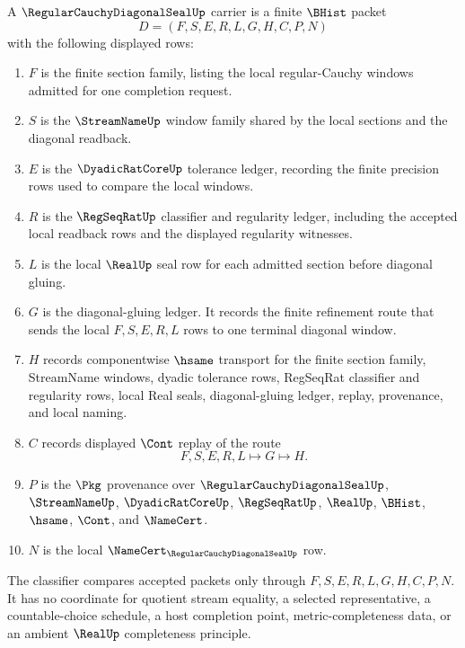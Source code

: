 \begin{definition}
\label{def:real-completeness-regular-cauchy-diagonal-seal-carrier}
A $\RegularCauchyDiagonalSealUp$ carrier is a finite $\BHist$ packet
$$
D=(F,S,E,R,L,G,H,C,P,N)
$$
with the following displayed rows:
\begin{enumerate}
\item $F$ is the finite section family, listing the local regular-Cauchy windows admitted for one completion request.
\item $S$ is the $\StreamNameUp$ window family shared by the local sections and the diagonal readback.
\item $E$ is the $\DyadicRatCoreUp$ tolerance ledger, recording the finite precision rows used to compare the local windows.
\item $R$ is the $\RegSeqRatUp$ classifier and regularity ledger, including the accepted local readback rows and the displayed regularity witnesses.
\item $L$ is the local $\RealUp$ seal row for each admitted section before diagonal gluing.
\item $G$ is the diagonal-gluing ledger. It records the finite refinement route that sends the local $F,S,E,R,L$ rows to one terminal diagonal window.
\item $H$ records componentwise $\hsame$ transport for the finite section family, StreamName windows, dyadic tolerance rows, RegSeqRat classifier and regularity rows, local Real seals, diagonal-gluing ledger, replay, provenance, and local naming.
\item $C$ records displayed $\Cont$ replay of the route
$$
F,S,E,R,L \longmapsto G \longmapsto H .
$$
\item $P$ is the $\Pkg$ provenance over $\RegularCauchyDiagonalSealUp$, $\StreamNameUp$, $\DyadicRatCoreUp$, $\RegSeqRatUp$, $\RealUp$, $\BHist$, $\hsame$, $\Cont$, and $\NameCert$.
\item $N$ is the local $\NameCert_{\RegularCauchyDiagonalSealUp}$ row.
\end{enumerate}
The classifier compares accepted packets only through $F,S,E,R,L,G,H,C,P,N$. It has no coordinate for quotient stream equality, a selected representative, a countable-choice schedule, a host completion point, metric-completeness data, or an ambient $\RealUp$ completeness principle.
\end{definition}

